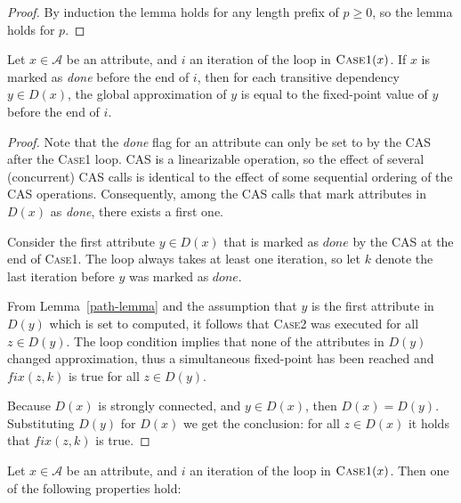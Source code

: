 {\begin{proof}
  By induction the lemma holds for any length prefix of $p \ge 0$, so the lemma holds for $p$.
\end{proof}


\begin{lemma}
  Let $x \in \mathcal{A}$ be an attribute,
  and $i$ an iteration of the loop in $\textsc{Case1}(x)$.
  If $x$ is marked as \emph{done} before the end of $i$,
  then for each transitive dependency $y \in D(x)$,
  the global approximation of $y$ is equal to the fixed-point value of $y$ before the end of $i$.


  \label{lemma:done-implies-fix}
\end{lemma}

\begin{proof}
  Note that the \emph{done} flag for an attribute can only be set to \true{} by the
  CAS after the \textsc{Case1} loop. CAS is a linearizable operation, so
  the effect of several (concurrent) CAS calls is identical to the effect of some sequential ordering
  of the CAS operations. Consequently, among the CAS calls that mark attributes in $D(x)$
  as \emph{done}, there exists a first one.

  Consider the first attribute $y \in D(x)$
  that is marked as $\mathit{done}$ by the CAS at the end of \textsc{Case1}.
  The loop always takes at least one iteration, so let $k$ denote
  the last iteration before $y$ was marked as $\mathit{done}$.

  From Lemma~\ref{path-lemma} and the assumption that $y$ is the first attribute in $D(y)$ which is
  set to computed, it follows that \textsc{Case2} was executed for all $z \in D(y)$. The loop
  condition implies that none of the attributes in $D(y)$ changed approximation, thus
  a simultaneous fixed-point has been reached and $\mathit{fix}(z, k)$ is true for all $z \in D(y)$.

  Because $D(x)$ is strongly connected, and $y \in D(x)$, then $D(x) = D(y)$.
  Substituting $D(y)$ for $D(x)$ we get the conclusion:
  for all $z \in D(x)$ it holds that $\mathit{fix}(z, k)$ is true.
\end{proof}

\begin{lemma}
  Let $x \in \mathcal{A}$ be an attribute,
  and $i$ an iteration of the loop in $\textsc{Case1}(x)$.
  Then one of the following properties hold:


\end{lemma}}
